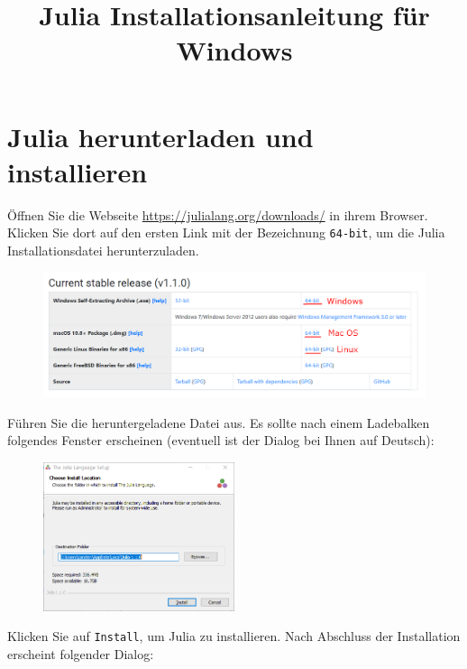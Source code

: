 \documentclass[11pt, a4paper]{scrartcl}
\title{Julia Installationsanleitung für Windows}
\author{}
\date{}
\begin{document}
	\maketitle
	
	
	
	
	
	
	\section{Julia herunterladen und installieren}
	Öffnen Sie die Webseite \url{https://julialang.org/downloads/} in ihrem Browser. Klicken Sie dort auf den ersten Link mit der Bezeichnung \texttt{64-bit}, um die Julia Installationsdatei herunterzuladen.
	
	\begin{figure}[h!]
		\centering
		\includegraphics[width=\textwidth]{imgs/download.png}
	\end{figure}

	Führen Sie die heruntergeladene Datei aus. Es sollte nach einem Ladebalken folgendes Fenster erscheinen (eventuell ist der Dialog bei Ihnen auf Deutsch):
	
	\begin{figure}[h!]
		\centering
		\includegraphics[width=0.5\textwidth]{imgs/install.png}
	\end{figure}

	Klicken Sie auf \texttt{Install}, um Julia zu installieren. Nach Abschluss der Installation erscheint folgender Dialog: 
	
\end{document}
